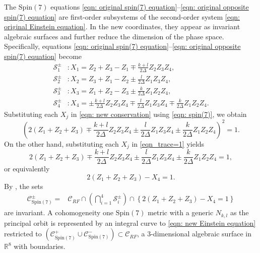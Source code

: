 \documentclass[11pt,letterpaper]{amsart}
\theoremstyle{definition}
\numberwithin{equation}{section}
\newcommand{\spin}{\mathrm{Spin}}
\begin{document}
The $\spin(7)$ equations \eqref{eqn: original spin(7) equation}–\eqref{eqn: original opposite spin(7) equation} are first-order subsystems of the second-order system \eqref{eqn: original Einstein equation}. In the new coordinates, they appear as invariant algebraic surfaces and further reduce the dimension of the phase space. Specifically, equations \eqref{eqn: original spin(7) equation}–\eqref{eqn: original opposite spin(7) equation} become
\begin{equation}
\label{eqn: spin(7)}
\begin{split}
\mathcal{S}_1^\pm&: X_1=Z_2+Z_3-Z_1\mp\frac{k+l}{2\Delta}Z_2Z_3Z_4,\\
\mathcal{S}_2^\pm&: X_2=Z_3+Z_1-Z_2\pm\frac{l}{2\Delta}Z_1Z_3Z_4,\\
\mathcal{S}_3^\pm&: X_3=Z_1+Z_2-Z_3\pm\frac{k}{2\Delta}Z_1Z_2Z_4,\\
\mathcal{S}_4^\pm&: X_4=\pm\frac{k+l}{2\Delta}Z_2Z_3Z_4\mp\frac{l}{2\Delta}Z_1Z_3Z_4\mp\frac{k}{2\Delta}Z_1Z_2Z_4.
\end{split}
\end{equation}
Substituting each $X_j$ in \eqref{eqn: new conservation} using \eqref{eqn: spin(7)}, we obtain
$$
\left(2(Z_1+Z_2+Z_3)\mp\frac{k+l}{2\Delta}Z_2Z_3Z_4\pm\frac{l}{2\Delta}Z_1Z_3Z_4\pm\frac{k}{2\Delta}Z_1Z_2Z_4\right)^2=1.
$$
On the other hand, substituting each $X_j$ in \eqref{eqn_trace=1} yields
\begin{equation}
\label{eqn: conservation Z spin(7) 1}
2(Z_1+Z_2+Z_3)\mp\frac{k+l}{2\Delta}Z_2Z_3Z_4\pm\frac{l}{2\Delta}Z_1Z_3Z_4\pm\frac{k}{2\Delta}Z_1Z_2Z_4=1,
\end{equation}
or equivalently
\begin{equation}
\label{eqn: conservation Z spin(7) 2}
2(Z_1+Z_2+Z_3)-X_4=1.
\end{equation}
By \cite[Proposition 2.2]{chi2022spin}, the sets
\begin{equation}
\label{eqn_spin7 conservation}
\begin{split}
\mathcal{C}^\pm_{\spin(7)}=&\mathcal{C}_{RF}\cap \left(\bigcap\limits_{i=1}^4\mathcal{S}_i^\pm\right)\cap \left\{2(Z_1+Z_2+Z_3)-X_4=1\right\}
\end{split}
\end{equation}
are invariant. A cohomogeneity one $\spin(7)$ metric with a generic $N_{k,l}$ as the principal orbit is represented by an integral curve to \eqref{eqn: new Einstein equation} restricted to $(\mathcal{C}^+_{\spin(7)}\cup \mathcal{C}^-_{\spin(7)}) \subset \mathcal{C}_{RF}$, a 3-dimensional algebraic surface in $\mathbb{R}^8$ with boundaries. 
\end{document}
